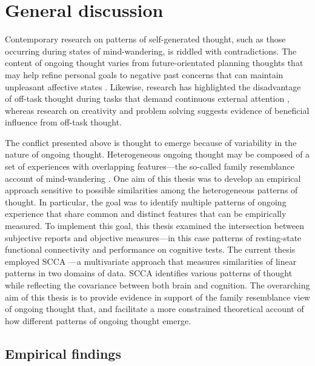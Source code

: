 \chapter{General discussion}
\label{ch:discussion}
Contemporary research on patterns of self-generated thought, such as those occurring during states of mind-wandering, is riddled with contradictions. The content of ongoing thought varies from future-orientated planning thoughts that may help refine personal goals \cite{Medea2016} to negative past concerns that can maintain unpleasant affective states \cite{Killingsworth2010}. Likewise, research has highlighted the disadvantage of off-task thought during tasks that demand continuous external attention \cite{McVayJOEP2009,McVay2012}, whereas research on creativity and problem solving suggests evidence of beneficial influence from off-task thought\cite{Smeekens2016,Baird2012}.

The conflict presented above is thought to emerge because of variability in the nature of ongoing thought. Heterogeneous ongoing thought may be composed of a set of experiences with overlapping features---the so-called family resemblance account of mind-wandering \cite{Smallwood2013, Seli2018}. One aim of this thesis was to develop an empirical approach sensitive to possible similarities among the heterogeneous patterns of thought.
In particular, the goal was to identify multiple patterns of ongoing experience that share common and distinct features that can be empirically measured. To implement this goal, this thesis examined the intersection between subjective reports and objective measures---in this case patterns of resting-state functional connectivity and performance on cognitive tests. The current thesis employed SCCA \cite{WittenSCCA2009}---a multivariate approach that measures similarities of linear patterns in two domains of data. SCCA identifies various patterns of thought while reflecting the covariance between both brain and cognition.
The overarching aim of this thesis is to provide evidence in support of the family resemblance view of ongoing thought that, and facilitate a more constrained theoretical account of how different patterns of ongoing thought emerge.

\section{Empirical findings}
\label{ch:discussion:results}

